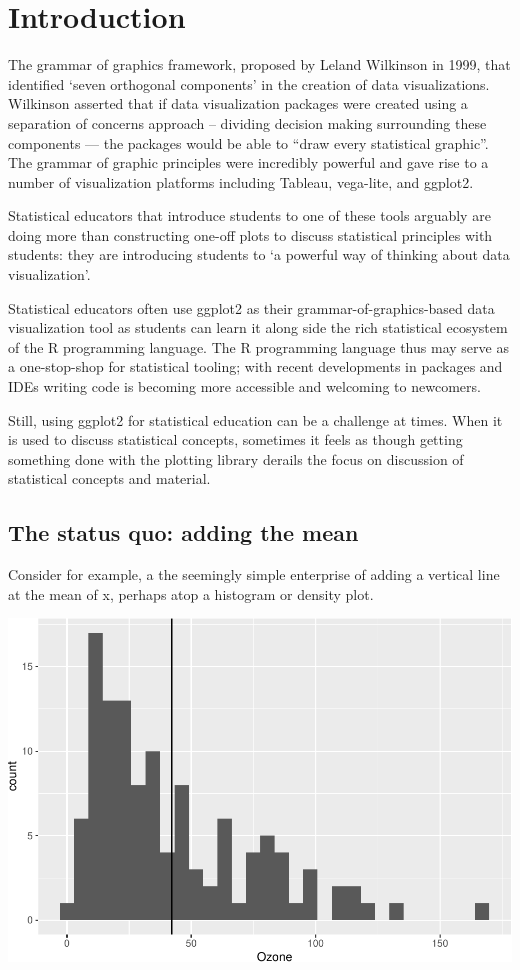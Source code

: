\documentclass[12pt]{article}
\begin{document}
\hypertarget{introduction}{%
\section{Introduction}\label{introduction}}

The grammar of graphics framework, proposed by Leland Wilkinson in 1999,
that identified `seven orthogonal components' in the creation of data
visualizations.\\
Wilkinson asserted that if data visualization packages were created
using a separation of concerns approach -- dividing decision making
surrounding these components --- the packages would be able to ``draw
every statistical graphic''. The grammar of graphic principles were
incredibly powerful and gave rise to a number of visualization platforms
including Tableau, vega-lite, and ggplot2.

Statistical educators that introduce students to one of these tools
arguably are doing more than constructing one-off plots to discuss
statistical principles with students: they are introducing students to
`a powerful way of thinking about data visualization'.

Statistical educators often use ggplot2 as their
grammar-of-graphics-based data visualization tool as students can learn
it along side the rich statistical ecosystem of the R programming
language. The R programming language thus may serve as a one-stop-shop
for statistical tooling; with recent developments in packages and IDEs
writing code is becoming more accessible and welcoming to newcomers.

Still, using ggplot2 for statistical education can be a challenge at
times. When it is used to discuss statistical concepts, sometimes it
feels as though getting something done with the plotting library derails
the focus on discussion of statistical concepts and material.

\hypertarget{the-status-quo-adding-the-mean}{%
\subsection{The status quo: adding the
mean}\label{the-status-quo-adding-the-mean}}

Consider for example, a the seemingly simple enterprise of adding a
vertical line at the mean of x, perhaps atop a histogram or density
plot.

\begin{center}\includegraphics[width=0.5\linewidth]{manuscript_files/figure-latex/unnamed-chunk-2-1} \end{center}
\end{document}
